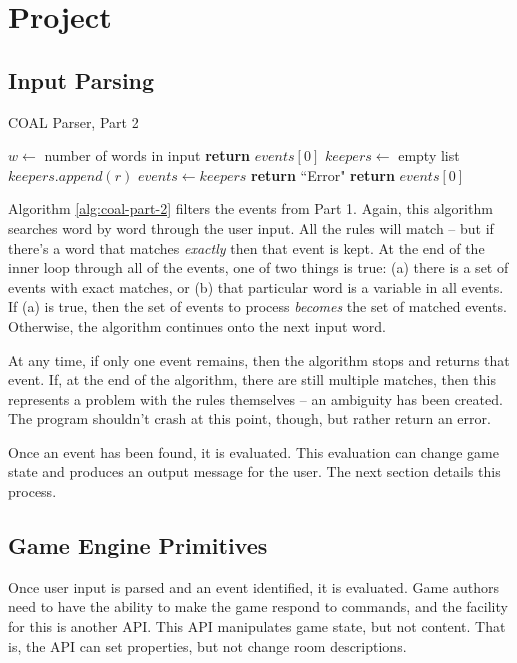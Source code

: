 \documentclass{article}
\newcommand{\enterProblemHeader}[1]{
}
\newcommand{\exitProblemHeader}[1]{
\nobreak\extramarks{#1}{}\nobreak
}
\newcounter{homeworkProblemCounter} %
\newcommand{\homeworkProblemName}{}
\newenvironment{homeworkProblem}[1][Problem \arabic{homeworkProblemCounter}]{ %
\stepcounter{homeworkProblemCounter} %
\renewcommand{\homeworkProblemName}{#1} %
\section{\homeworkProblemName} %
\enterProblemHeader{\homeworkProblemName} %
}{
\exitProblemHeader{\homeworkProblemName} %
}
\newcommand{\homeworkSectionName}{}
\newenvironment{homeworkSection}[1]{ %
\renewcommand{\homeworkSectionName}{#1} %
\subsection{\homeworkSectionName} %
\enterProblemHeader{\homeworkProblemName\ [\homeworkSectionName]} %
}{
\enterProblemHeader{\homeworkProblemName} %
}
\begin{document}
\begin{homeworkProblem}[Project]
\begin{homeworkSection}{Input Parsing}
	\begin{algorithm}
		\caption{COAL Parser, Part 2}
		\label{alg:coal-part-2}
		\begin{algorithmic}
				\State $w \gets$ number of words in input
						\State \textbf{return} $events[0]$
					\EndIf
					\State $keepers \gets$ empty list
							\State $keepers.append(r)$
						\EndIf
					\EndFor
						\State $events \gets keepers$
					\EndIf
				\EndFor
					\State \textbf{return} ``Error"
				\EndIf
				\State \textbf{return} $events[0]$
			\EndProcedure
		\end{algorithmic}
	\end{algorithm}

	Algorithm \ref{alg:coal-part-2} filters the events from Part 1. Again, this algorithm searches word by word through the user input. All the rules will match -- but if there's a word that matches \textit{exactly} then that event is kept. At the end of the inner loop through all of the events, one of two things is true: (a) there is a set of events with exact matches, or (b) that particular word is a variable in all events. If (a) is true, then the set of events to process \textit{becomes} the set of matched events. Otherwise, the algorithm continues onto the next input word.

	At any time, if only one event remains, then the algorithm stops and returns that event. If, at the end of the algorithm, there are still multiple matches, then this represents a problem with the rules themselves -- an ambiguity has been created. The program shouldn't crash at this point, though, but rather return an error.

	Once an event has been found, it is evaluated. This evaluation can change game state and produces an output message for the user. The next section details this process.

\end{homeworkSection}

\begin{homeworkSection}{Game Engine Primitives}
	Once user input is parsed and an event identified, it is evaluated. Game authors need to have the ability to make the game respond to commands, and the facility for this is another API. This API manipulates game state, but not content. That is, the API can set properties, but not change room descriptions.


\end{homeworkSection}
\end{homeworkProblem}
\end{document}
